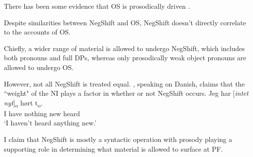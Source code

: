 \documentclass[12pt, letterpaper]{article}
\begin{document}
\ex There has been some evidence that OS is prosodically driven \citep{erteschik-shirSoundPatternsSyntax2005,erteschik-shirScandinavianObjectShift2017,erteschik-shirVariationMainlandScandinavian2020,brinkerhoffMATCHINGPhrasesNorwegian2021}. 

\ex Despite similarities between NegShift and OS, NegShift doesn't directly correlate to the accounts of OS. 

\ex Chiefly, a wider range of material is allowed to undergo NegShift, which includes both pronouns and full DPs, whereas only prosodically weak object pronouns are allowed to undergo OS.

\ex However, not all NegShift is treated equal. \citet[65f]{christensenInterfacesNegationSyntax2005}, speaking on Danish, claims that the ``weight" of the NI plays a factor in whether or not NegShift occurs. 
	\ea
	\gll Jeg har [\textit{intet} \textit{nyt}]\textsubscript{o} hørt t\textsubscript{o}.\\
	I have nothing new heard\\
	\glt `I haven't heard anything new.'
	\z

\begin{tcolorbox}[width=\linewidth]
\centering
I claim that NegShift is mostly a syntactic operation with prosody playing a supporting role in determining what material is allowed to surface at PF. 
\end{tcolorbox}	
\z 
\end{document}
